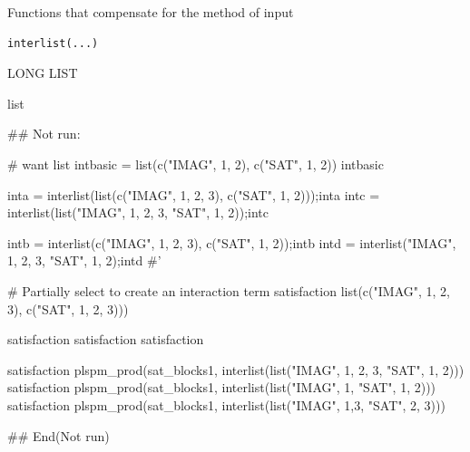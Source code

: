 \documentclass[a4paper]{book}
\begin{document}
%
\begin{Description}
Functions that compensate for the method of input
\end{Description}
%
\begin{Usage}
\begin{verbatim}
interlist(...)
\end{verbatim}
\end{Usage}
%
\begin{Arguments}
\begin{ldescription}
\item[\code{...}] LONG LIST
\end{ldescription}
\end{Arguments}
%
\begin{Value}
list
\end{Value}
%
\begin{Examples}
\begin{ExampleCode}

\#\# Not run: 


# want list
intbasic = list(c("IMAG", 1, 2), c("SAT", 1, 2))
intbasic

inta = interlist(list(c("IMAG", 1, 2, 3), c("SAT", 1, 2)));inta
intc = interlist(list("IMAG", 1, 2, 3, "SAT", 1, 2));intc

intb = interlist(c("IMAG", 1, 2, 3), c("SAT", 1, 2));intb
intd = interlist("IMAG", 1, 2, 3, "SAT", 1, 2);intd
#'

# Partially select to create an interaction term
satisfaction%
                           list(c("IMAG", 1, 2, 3), c("SAT", 1, 2, 3))) %

satisfaction%
satisfaction%
satisfaction%



satisfaction%
plspm_prod(sat_blocks1, interlist(list("IMAG", 1, 2, 3, "SAT", 1, 2))) %
satisfaction%
plspm_prod(sat_blocks1, interlist(list("IMAG", 1, "SAT", 1, 2))) %
satisfaction%
plspm_prod(sat_blocks1, interlist(list("IMAG", 1,3,  "SAT", 2, 3))) %





## End(Not run)



\end{ExampleCode}
\end{Examples}
\end{document}
